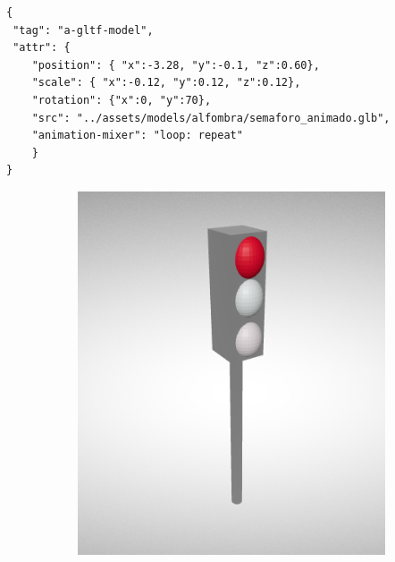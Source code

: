 \documentclass{report}
\begin{document}
\newpage
\begin{lstlisting}[backgroundcolor = \color{light-gray},
				   aboveskip = 2em,
				   belowskip = 2em,
                   xleftmargin = 2cm,
                   framexleftmargin = 1em,
                   basicstyle=\small]
{
 "tag": "a-gltf-model",
 "attr": {
	"position": { "x":-3.28, "y":-0.1, "z":0.60},
	"scale": { "x":-0.12, "y":0.12, "z":0.12},
	"rotation": {"x":0, "y":70},
	"src": "../assets/models/alfombra/semaforo_animado.glb",
	"animation-mixer": "loop: repeat"
	}
}
\end{lstlisting}

\renewcommand{\figurename}{Figura}		
\begin{figure}[h]
  \begin{subfigure}[b]{0.3\textwidth}
    \includegraphics[width=\textwidth, height=1.2\textwidth]{images/cap4/rojo.png}
    \label{fig:f1}
  \end{subfigure}
  \hfill
  \begin{subfigure}[b]{0.3\textwidth}

\end{subfigure}
\end{figure}
\end{document}
